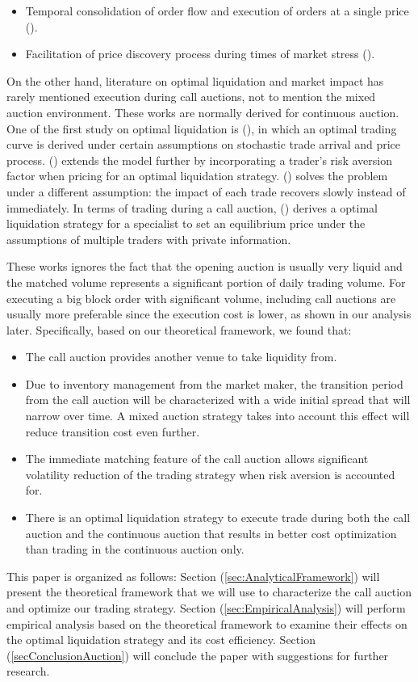 \begin{itemize}
  \item Temporal consolidation of order flow and execution of orders at a single price (\cite{Economides1995}).
  \item Facilitation of price discovery process during times of market stress (\cite{Madhavan1992}).
\end{itemize}

On the other hand, literature on optimal liquidation and market impact has rarely mentioned execution during call auctions, not to mention the mixed auction environment. These works are normally derived for continuous auction. One of the first study on optimal liquidation is (\cite{Ho1981}), in which an optimal trading curve is derived under certain assumptions on stochastic trade arrival and price process. (\cite{Almgren2000}) extends the model further by incorporating a trader's risk aversion factor when pricing for an optimal liquidation strategy. (\cite{Obizhaeva2013}) solves the problem under a different assumption: the impact of each trade recovers slowly instead of immediately. In terms of trading during a call auction, (\cite{Madhavan2015}) derives a optimal liquidation strategy for a specialist to set an equilibrium price under the assumptions of multiple traders with private information.

These works ignores the fact that the opening auction is usually very liquid and the matched volume represents a significant portion of daily trading volume. For executing a big block order with significant volume, including call auctions are usually more preferable since the execution cost is lower, as shown in our analysis later. Specifically, based on our theoretical framework, we found that:

\begin{itemize}
  \item The call auction provides another venue to take liquidity from.
  \item Due to inventory management from the market maker, the transition period from the call auction will be characterized with a wide initial spread that will narrow over time. A mixed auction strategy takes into account this effect will reduce transition cost even further.
  \item The immediate matching feature of the call auction allows significant volatility reduction of the trading strategy when risk aversion is accounted for.
  \item There is an optimal liquidation strategy to execute trade during both the call auction and the continuous auction that results in better cost optimization than trading in the continuous auction only.
\end{itemize}

This paper is organized as follows: Section (\ref{sec:AnalyticalFramework}) will present the theoretical framework that we will use to characterize the call auction and optimize our trading strategy. Section (\ref{sec:EmpiricalAnalysis}) will perform empirical analysis based on the theoretical framework to examine their effects on the optimal liquidation strategy and its cost efficiency. Section (\ref{secConclusionAuction}) will conclude the paper with suggestions for further research.